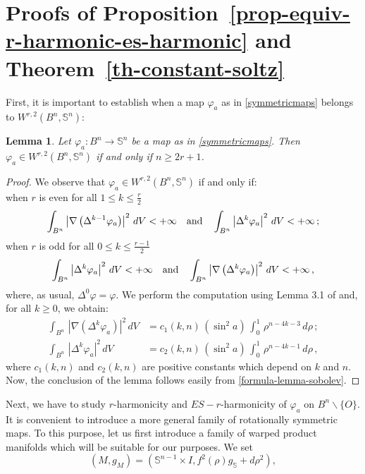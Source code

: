 \documentclass[11pt]{amsart}
\theoremstyle{plain}
\newtheorem{lemma}        [theorem]  {Lemma}
\theoremstyle{definition}
\numberwithin{equation}{section}
\def \s{{\mathbb S}}
\numberwithin{equation}{section}
\begin{document}
\section{Proofs of Proposition~\ref{prop-equiv-r-harmonic-es-harmonic} and Theorem~\ref{th-constant-soltz}}\label{proofs}
First, it is important to establish when a map $\varphi_a$ as in \eqref{symmetricmaps} belongs to $W^{r,2}\left ( B^n,\s^n \right )$:
\begin{lemma}\label{lemma-belong-Sobolev-space}
Let
$\varphi_a:B^n \to \s^n$ be a map as in \eqref{symmetricmaps}. Then $\varphi_a \in W^{r,2}\left ( B^n,\s^n \right )$ if and only if $n\geq 2r+1$.
\end{lemma}
\begin{proof} We observe that $\varphi_a \in W^{r,2}\left ( B^n,\s^n \right )$ if and only if:\\
when $r$ is even for all $1 \leq k \leq \frac{r}{2}$
\[
\int_{B^n}  \left | \nabla \left (\Delta^{k-1}\varphi_a\right )\right |^2 \, dV < +\infty \quad {\rm and} \quad \int_{B^n}  \left | \Delta^k \varphi_a\right |^2 \, dV < +\infty\,;
\]
when $r$ is odd for all $0 \leq k \leq \frac{r-1}{2}$ 
\[
\int_{B^n} \left | \Delta^k \varphi_a\right |^2 \, dV < +\infty \quad {\rm and}\quad \int_{B^n}  \left | \nabla \left (\Delta^{k}\varphi_a\right )\right |^2 \, dV < +\infty  \,,
\]
where, as usual, $\Delta^0 \varphi=\varphi$. We perform the computation using Lemma 3.1 of \cite{FMR} and, for all $k \geq 0$, we obtain:
\begin{equation}\label{formula-lemma-sobolev}
\begin{split}
\int_{B^n} \, \left | \nabla \left (\Delta^{k}\varphi_a\right )\right |^2 \, dV &= c_1(k,n)\,(\sin^2 a)\,\int_0^1 \,  \rho^{n-4k-3}\,d\rho  \,; \\ 
 \int_{B^n} \, \left | \Delta^k \varphi_a\right |^2 \, dV &= c_2(k,n)\,(\sin^2 a )\,\int_0^1 \,  \rho^{n-4k-1}\,d\rho \,,
\end{split}
\end{equation}
where $c_1(k,n)$ and $c_2(k,n)$ are positive constants which depend on $k$ and $n$. Now, the conclusion of the lemma follows easily from \eqref{formula-lemma-sobolev}.
\end{proof}
Next, we have to study $r$-harmonicity and $ES-r$-harmonicity of $\varphi_a$ on $B^n \backslash \{ O\}$. It is convenient to introduce a more general family of rotationally symmetric maps.
To this purpose, let us first introduce a family of warped product manifolds which will be suitable for our purposes. We set
\begin{equation}\label{rotationallysymmetricmanifolds}
\left( M,g_M \right )= \left (\s^{n-1} \times I, f^2(\rho)g_{\s}+d\rho^2 \right ),
\end{equation}
\end{document}

